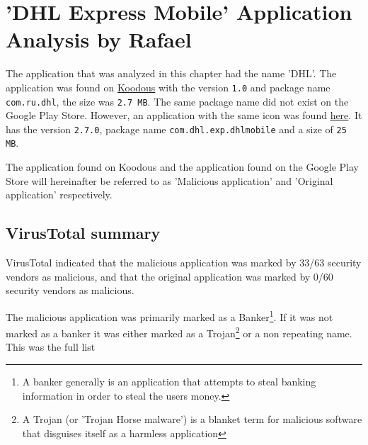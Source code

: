 \section{'DHL Express Mobile' Application Analysis by Rafael}

The application that was analyzed in this chapter had the name 'DHL'.
The application was found on \href{https://koodous.com/apks/38ff459a46e9ea6d63a83c1eddb640626fef562cd1bcb0ab3823c4770d07d0fb}{Koodous} with the version \texttt{1.0} and package name \texttt{com.ru.dhl}, the size was \texttt{2.7 MB}.
The same package name did not exist on the Google Play Store. However, an application with the same icon was found \href{https://play.google.com/store/apps/details?id=com.dhl.exp.dhlmobile}{here}. It has the version \texttt{2.7.0}, package name \texttt{com.dhl.exp.dhlmobile} and a size of \texttt{25 MB}.

The application found on Koodous and the application found on the Google Play Store will hereinafter be referred to as 'Malicious application' and 'Original application' respectively.

\newpage
\subsection{VirusTotal summary}

VirusTotal indicated that the malicious application was marked by 33/63 security vendors as malicious, 
and that the original application was marked by 0/60 security vendors as malicious.

The malicious application was primarily marked as a Banker\footnote{A banker generally is an application that attempts to steal banking information in order to steal the users money.}. 
If it was not marked as a banker it was either marked as a Trojan\footnote{A Trojan (or 'Trojan Horse malware') is a blanket term for malicious software that disguises itself as a harmless application} or a non repeating name.
This was the full list


